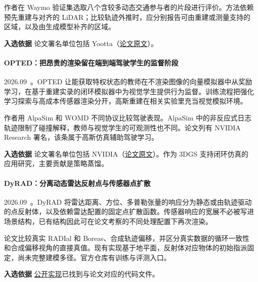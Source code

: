 作者在 Waymo 验证集选取八个含较多动态交通参与者的片段进行评价。方法依赖预先重建与对齐的 LiDAR；比较轨迹外推时，应分别报告可由重建或测量支持的区域，以及由生成模型补齐的区域。

\textbf{入选依据} 论文署名单位包括 Yootta（\href{https://arxiv.org/abs/2609.06948}{论文原文}）。

\paragraph{OPTED：把昂贵的渲染留在端到端驾驶学生的监督阶段}
2026.09~\cite{2609_20756}。OPTED 让能获取特权状态的教师在不渲染图像的向量模拟器中从奖励学习，在基于重建实录的闭环模拟器中为视觉学生提供行为监督。训练流程把强化学习探索与高成本传感器渲染分开，高斯重建在相关实验里充当视觉模拟环境。

作者用 AlpaSim 和 WOMD 不同协议比较驾驶表现。AlpaSim 中的非反应式日志轨迹限制了碰撞解释，教师与视觉学生的可观测性也不同。论文列有 NVIDIA Research 署名，该条属于高斯仿真辅助驾驶学习。

\textbf{入选依据} 论文署名单位包括 NVIDIA（\href{https://arxiv.org/html/2609.20756v1}{论文原文}）。作为 3DGS 支持闭环仿真的应用研究，主要贡献是策略蒸馏。

\paragraph{DyRAD：分离动态雷达反射点与传感器点扩散}
2026.09~\cite{2609_39841}。DyRAD 将雷达距离、方位、多普勒张量的响应分为静态或由轨迹驱动的点反射体，以及依赖雷达配置的固定点扩散函数。传感器响应的宽展不必被写进场景结构，已有结构因此可在论文考察的不同处理配置下再次渲染。

论文比较真实 RADIal 和 Boreas、合成轨迹偏移，并区分真实数据的循环一致性和合成偏移视角的直接真值。现有实现基于地平面，反射体对应物体的初始指派固定，尚未完整建模多径。官方仓库有训练与评测入口。

\textbf{入选依据} \href{https://github.com/dyrad-nvs/dyrad}{公开实现}已找到与论文对应的代码文件。
